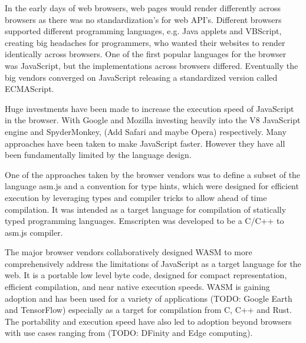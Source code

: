 \documentclass[11pt]{book}
\begin{document}
In the early days of web browsers, web pages would render differently across browsers as there was no standardization's for web API's. Different browsers supported different programming languages, e.g. Java applets and VBScript, creating big headaches for programmers, who wanted their websites to render identically across browsers. One of the first popular languages for the browser was JavaScript, but the implementations across browsers differed. Eventually the big vendors converged on JavaScript releasing a standardized version called ECMAScript. 

Huge investments have been made to increase the execution speed of JavaScript in the browser. With Google and Mozilla investing heavily into the V8 JavaScript engine and SpyderMonkey, (Add Safari and maybe Opera) respectively. Many approaches have been taken to make JavaScript faster. However they have all been fundamentally limited by the language design. 


One of the approaches taken by the browser vendors was to define a subset of the language asm.js and a convention for type hints, which were designed for efficient execution by leveraging types and compiler tricks to allow ahead of time compilation. It was intended as a target language for compilation of statically typed programming languages. Emscripten \cite{emcc} was developed to be a C/C++ to asm.js compiler. 

The major browser vendors collaboratively designed WASM \cite{wasm_og} to more comprehensively address the limitations of JavaScript as a target language for the web. It is a portable low level byte code, designed for compact representation, efficient compilation, and near native execution speeds. WASM is gaining adoption and has been used for a variety of applications (TODO: Google Earth and TensorFlow) especially as a target for compilation from C, C++ and Rust. The portability and execution speed have also led to adoption beyond browsers with use cases ranging from (TODO: DFinity and Edge computing). 

\end{document}
